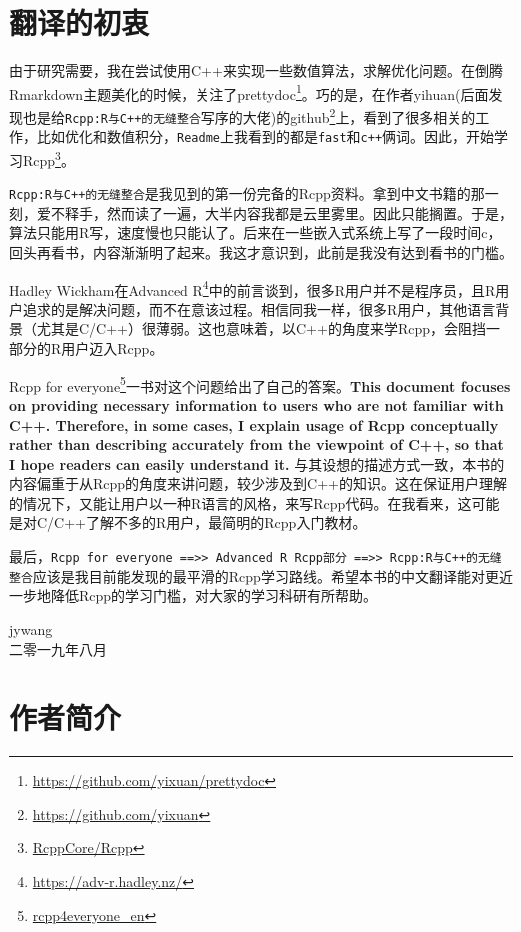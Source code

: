 \documentclass[]{ctexbook}
\renewcommand{\href}[2]{#2\footnote{\url{#1}}}
\let\BeginKnitrBlock\begin \let\EndKnitrBlock\end
\begin{document}
\chapter*{翻译的初衷}


由于研究需要，我在尝试使用C++来实现一些数值算法，求解优化问题。在倒腾Rmarkdown主题美化的时候，关注了\href{https://github.com/yixuan/prettydoc}{prettydoc}。巧的是，在作者yihuan(后面发现也是给\texttt{Rcpp:R与C++的无缝整合}写序的大佬)的\href{https://github.com/yixuan}{github}上，看到了很多相关的工作，比如优化和数值积分，\texttt{Readme}上我看到的都是\texttt{fast}和\texttt{c++}俩词。因此，开始学习\href{RcppCore/Rcpp}{Rcpp}。

\texttt{Rcpp:R与C++的无缝整合}是我见到的第一份完备的Rcpp资料。拿到中文书籍的那一刻，爱不释手，然而读了一遍，大半内容我都是云里雾里。因此只能搁置。于是，算法只能用R写，速度慢也只能认了。后来在一些嵌入式系统上写了一段时间c，回头再看书，内容渐渐明了起来。我这才意识到，此前是我没有达到看书的门槛。

Hadley Wickham在\href{https://adv-r.hadley.nz/}{Advanced
R}中的前言谈到，很多R用户并不是程序员，且R用户追求的是解决问题，而不在意该过程。相信同我一样，很多R用户，其他语言背景（尤其是C/C++）很薄弱。这也意味着，以C++的角度来学Rcpp，会阻挡一部分的R用户迈入Rcpp。

\href{rcpp4everyone_en}{Rcpp for
everyone}一书对这个问题给出了自己的答案。\textbf{This document focuses
on providing necessary information to users who are not familiar with
C++. Therefore, in some cases, I explain usage of Rcpp conceptually
rather than describing accurately from the viewpoint of C++, so that I
hope readers can easily understand it.}
与其设想的描述方式一致，本书的内容偏重于从Rcpp的角度来讲问题，较少涉及到C++的知识。这在保证用户理解的情况下，又能让用户以一种R语言的风格，来写Rcpp代码。在我看来，这可能是对C/C++了解不多的R用户，最简明的Rcpp入门教材。

最后，\texttt{Rcpp\ for\ everyone\ ==\textgreater{}\textgreater{}\ Advanced\ R\ Rcpp部分\ ==\textgreater{}\textgreater{}\ Rcpp:R与C++的无缝整合}应该是我目前能发现的最平滑的Rcpp学习路线。希望本书的中文翻译能对更近一步地降低Rcpp的学习门槛，对大家的学习科研有所帮助。

\BeginKnitrBlock{flushright}
jywang\\
二零一九年八月
\EndKnitrBlock{flushright}

\chapter*{作者简介}\label{author}
\end{document}
